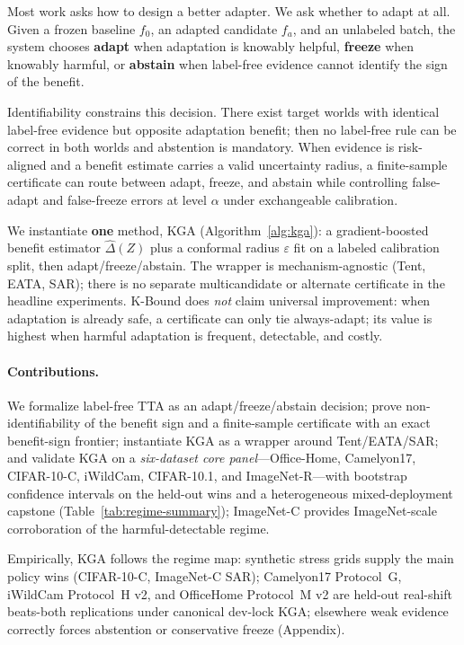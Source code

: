 \documentclass[11pt]{article}
\theoremstyle{plain}
\theoremstyle{definition}
\theoremstyle{remark}
\begin{document}
Most work asks how to design a better adapter. We ask whether to adapt at all.
Given a frozen baseline $f_0$, an adapted candidate $f_a$, and an unlabeled batch,
the system chooses \textbf{adapt} when adaptation is knowably helpful, \textbf{freeze}
when knowably harmful, or \textbf{abstain} when label-free evidence cannot identify
the sign of the benefit.

Identifiability constrains this decision. There exist target worlds with identical
label-free evidence but opposite adaptation benefit; then no label-free rule can be
correct in both worlds and abstention is mandatory. When evidence is risk-aligned and
a benefit estimate carries a valid uncertainty radius, a finite-sample certificate can
route between adapt, freeze, and abstain while controlling false-adapt and false-freeze
errors at level $\alpha$ under exchangeable calibration.

We instantiate \textbf{one} method, \textsc{KGA} (Algorithm~\ref{alg:kga}): a gradient-boosted
benefit estimator $\widehat\Delta(Z)$ plus a conformal radius $\varepsilon$ fit on a labeled
calibration split, then adapt/freeze/abstain. The wrapper is mechanism-agnostic (Tent, EATA, SAR);
there is no separate multicandidate or alternate certificate in the headline experiments.
K-Bound does \emph{not} claim universal improvement: when adaptation is already safe,
a certificate can only tie always-adapt; its value is highest when harmful adaptation
is frequent, detectable, and costly.

\paragraph{Contributions.}
We formalize label-free TTA as an adapt/freeze/abstain decision; prove non-identifiability
of the benefit sign and a finite-sample certificate with an exact benefit-sign frontier;
instantiate \textsc{KGA} as a wrapper around Tent/EATA/SAR; and validate \textsc{KGA} on a
\emph{six-dataset core panel}---Office-Home, Camelyon17, CIFAR-10-C, iWildCam, CIFAR-10.1, and
ImageNet-R---with bootstrap confidence intervals on the held-out wins and a heterogeneous
mixed-deployment capstone (Table~\ref{tab:regime-summary}); ImageNet-C provides ImageNet-scale
corroboration of the harmful-detectable regime.

Empirically, \textsc{KGA} follows the regime map: synthetic stress grids supply the main
policy wins (CIFAR-10-C, ImageNet-C SAR); Camelyon17 Protocol~G, iWildCam Protocol~H v2,
and OfficeHome Protocol~M v2 are held-out real-shift beats-both replications under canonical
dev-lock \textsc{KGA}; elsewhere weak evidence correctly forces abstention or
conservative freeze (Appendix).
\end{document}
